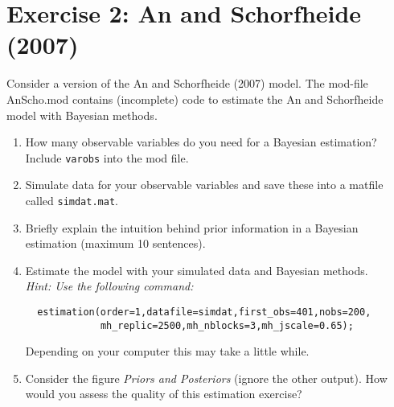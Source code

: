 \documentclass{article}
\begin{document}
\section*{Exercise 2: An and Schorfheide (2007)}
Consider a version of the An and Schorfheide (2007) model. The mod-file AnScho.mod contains (incomplete) code to estimate the An and Schorfheide model with Bayesian methods.
\begin{enumerate}
  \item How many observable variables do you need for a Bayesian estimation? Include \texttt{varobs} into the mod file.
  \item Simulate data for your observable variables and save these into a matfile called \texttt{simdat.mat}.
  \item Briefly explain the intuition behind prior information in a Bayesian estimation (maximum 10 sentences).
  \item Estimate the model with your simulated data and Bayesian methods.\\ \emph{Hint: Use the following command:}
  \begin{verbatim}
  estimation(order=1,datafile=simdat,first_obs=401,nobs=200,
             mh_replic=2500,mh_nblocks=3,mh_jscale=0.65); \end{verbatim}
  Depending on your computer this may take a little while.
  \item Consider the figure \emph{Priors and Posteriors} (ignore the other output). How would you assess the quality of this estimation exercise?
\end{enumerate}
\end{document}
